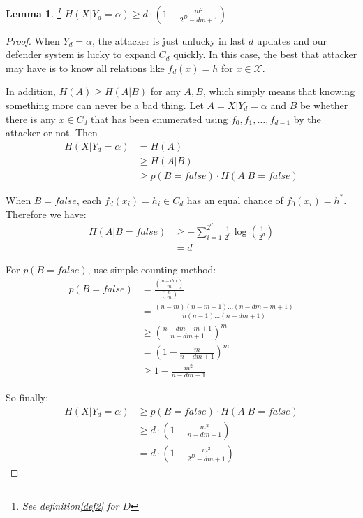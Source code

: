 \documentclass[10pt,a4paper]{article}
\newtheorem{mylemma}{Lemma}
\begin{document}
		\begin{mylemma}\label{lem1}\footnote{See definition\ref{def2} for $D$}
			$H(X|Y_d = \alpha) \geq d \cdot (1-\frac{m^2}{2^D-dm+1})$
		\end{mylemma}
		
		\begin{proof}
			When $Y_d = \alpha$, the attacker
			is just unlucky in last $d$ updates
			and our defender system is lucky
			to expand $C_d$ quickly.
			In this case, the best that attacker
			may have is to know all relations
			like $f_d(x) = h$ for $x \in \mathcal X$.
			
			In addition, $H(A) \geq H(A|B)$ for
			any $A, B$, which simply means that knowing something
			more can never be a bad thing. Let $A = X | Y_d = \alpha$
			and $B$ be whether there is any $x \in C_d$ that
			has been enumerated using $f_0, f_1, \ldots, f_{d-1}$ 
			by the attacker or not.
			Then
			\begin{align*}
				H(X | Y_d = \alpha) &= H(A)\\
					&\geq H(A | B)\\
					&\geq p(B = false) \cdot H(A | B = false)
			\end{align*}
			
			When $B = false$, each $f_d(x_i) = h_i \in C_d$
			has an equal chance of $f_0(x_i) = h^*$. Therefore
			we have:
			\begin{align*}
				H(A | B = false) &\geq -\sum_{i = 1}^{2^d} \frac{1}{2^d} \log(\frac{1}{2^d})\\
					&= d
			\end{align*}
			
			For $p(B = false)$, use simple counting method:
			\begin{align*}
				p(B = false) &= \frac{\binom{n-dm}{m}}{\binom{n}{m}}\\
					&= \frac{(n-m)(n-m-1)\ldots(n-dm-m+1)}{n(n-1)\ldots(n-dm+1)}\\
					&\geq (\frac{n-dm-m+1}{n-dm+1})^m\\
					&= (1-\frac{m}{n-dm+1})^m\\
					&\geq 1-\frac{m^2}{n-dm+1}
			\end{align*}
			
			So finally:
			\begin{align*}
				H(X | Y_d = \alpha) &\geq p(B = false) \cdot H(A | B = false)\\
					&\geq d \cdot (1-\frac{m^2}{n-dm+1})\\
					&= d \cdot (1-\frac{m^2}{2^D-dm+1})
			\end{align*}
		\end{proof}
		
\end{document}
